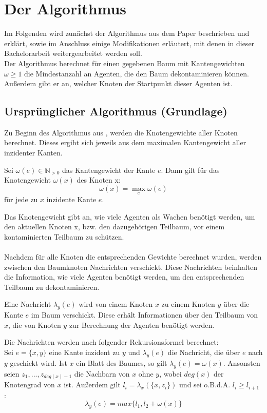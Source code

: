 \section{Der Algorithmus}\label{kap_algorithmus}
Im Folgenden wird zunächst der Algorithmus aus dem Paper \cite{cima_paper} beschrieben und erklärt, sowie im Anschluss einige Modifikationen erläutert, mit denen in dieser Bachelorarbeit weitergearbeitet werden soll.\\
Der Algorithmus berechnet für einen gegebenen Baum mit Kantengewichten $\omega \geq 1$ die Mindestanzahl an Agenten, die den Baum dekontaminieren können. Außerdem gibt er an, welcher Knoten der Startpunkt dieser Agenten ist.


\subsection{Ursprünglicher Algorithmus (Grundlage)}\label{paperAlgoChapter}

Zu Beginn des Algorithmus aus \cite{cima_paper}, werden die Knotengewichte aller Knoten berechnet. Dieses ergibt sich jeweils aus dem maximalen Kantengewicht aller inzidenter Kanten. 

\begin{mydef}
	Sei $\omega(e) \in \mathbb N_{> 0}$ das Kantengewicht der Kante $e$. Dann gilt für das Knotengewicht $\omega(x)$ des Knoten x:   $$\omega(x) = \max_{e} \omega(e)$$ für jede zu $x$ inzidente Kante $e$.
\end{mydef}

Das Knotengewicht gibt an, wie viele Agenten als Wachen benötigt werden, um den aktuellen Knoten x, bzw. den dazugehörigen Teilbaum, vor einem kontaminierten Teilbaum zu schützen.
\\
\\
Nachdem für alle Knoten die entsprechenden Gewichte berechnet wurden, werden zwischen den Baumknoten Nachrichten verschickt. Diese Nachrichten beinhalten die Information, wie viele Agenten benötigt werden, um den entsprechenden Teilbaum zu dekontaminieren.  

\begin{mydef}\label{def_nachricht}
	Eine Nachricht $\lambda_{y}(e)$ wird von einem Knoten $x$ zu einem Knoten $y$ über die Kante $e$ im Baum verschickt. Diese erhält Informationen über den Teilbaum von $x$, die von Knoten $y$ zur Berechnung der Agenten benötigt werden.
\end{mydef}

Die Nachrichten werden nach folgender Rekursionsformel \cite{cima_paper} berechnet:\\
Sei $e = \{x, y\}$ eine Kante inzident zu $y$ und $\lambda_{y}(e)$ die Nachricht, die über $e$ nach $y$ geschickt wird. Ist $x$ ein Blatt des Baumes, so gilt $\lambda_{y}(e) = \omega(x)$. Ansonsten seien $z_{1}, ..., z_{deg(x)-1}$ die Nachbarn von $x$ ohne $y$, wobei $deg(x)$ der Knotengrad von $x$ ist.  Außerdem gilt $l_{i} = \lambda_{x}(\{x, z_{i}\})$ und sei o.B.d.A. $l_{i} \geq l_{i+1}$ \cite{cima_paper}: $$\lambda_{y}(e) = max \{l_{1}, l_{2} + \omega(x)\}$$

